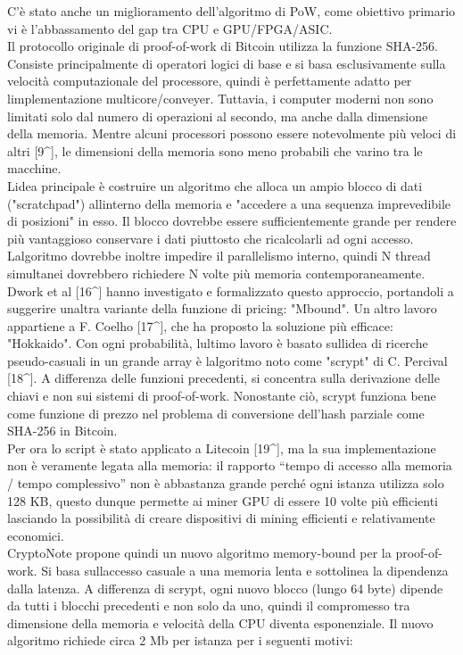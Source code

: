 C'è stato anche un miglioramento dell'algoritmo di PoW, come obiettivo
primario vi è l'abbassamento del gap tra CPU e GPU/FPGA/ASIC.\\
Il protocollo originale di proof-of-work di Bitcoin utilizza la funzione
SHA-256.\\
Consiste principalmente di operatori logici di base e si basa
esclusivamente sulla velocità computazionale del processore, quindi è
perfettamente adatto per l\textquotesingle implementazione
multicore/conveyer. Tuttavia, i computer moderni non sono limitati solo
dal numero di operazioni al secondo, ma anche dalla dimensione della
memoria. Mentre alcuni processori possono essere notevolmente più veloci
di altri {[}9\^{}{]}, le dimensioni della memoria sono meno probabili
che varino tra le macchine.\\
L\textquotesingle idea principale è costruire un algoritmo che alloca un
ampio blocco di dati ("scratchpad") all\textquotesingle interno della
memoria e "accedere a una sequenza imprevedibile di posizioni" in esso.
Il blocco dovrebbe essere sufficientemente grande per rendere più
vantaggioso conservare i dati piuttosto che ricalcolarli ad ogni
accesso. L\textquotesingle algoritmo dovrebbe inoltre impedire il
parallelismo interno, quindi N thread simultanei dovrebbero richiedere N
volte più memoria contemporaneamente.\\
Dwork et al {[}16\^{}{]} hanno investigato e formalizzato questo
approccio, portandoli a suggerire un\textquotesingle altra variante
della funzione di pricing: "Mbound". Un altro lavoro appartiene a F.
Coelho {[}17\^{}{]}, che ha proposto la soluzione più efficace:
"Hokkaido". Con ogni probabilità, l\textquotesingle ultimo lavoro è
basato sull\textquotesingle idea di ricerche pseudo-casuali in un grande
array è l\textquotesingle algoritmo noto come "scrypt" di C. Percival
{[}18\^{}{]}. A differenza delle funzioni precedenti, si concentra sulla
derivazione delle chiavi e non sui sistemi di proof-of-work. Nonostante
ciò, scrypt funziona bene come funzione di prezzo nel problema di
conversione dell'hash parziale come SHA-256 in Bitcoin.\\
Per ora lo script è stato applicato a Litecoin {[}19\^{}{]}, ma la sua
implementazione non è veramente legata alla memoria: il rapporto ``tempo
di accesso alla memoria / tempo complessivo'' non è abbastanza grande
perché ogni istanza utilizza solo 128 KB, questo dunque permette ai
miner GPU di essere 10 volte più efficienti lasciando la possibilità di
creare dispositivi di mining efficienti e relativamente economici.\\
CryptoNote propone quindi un nuovo algoritmo memory-bound per la
proof-of-work. Si basa sull\textquotesingle accesso casuale a una
memoria lenta e sottolinea la dipendenza dalla latenza. A differenza di
scrypt, ogni nuovo blocco (lungo 64 byte) dipende da tutti i blocchi
precedenti e non solo da uno, quindi il compromesso tra dimensione della
memoria e velocità della CPU diventa esponenziale. Il nuovo algoritmo
richiede circa 2 Mb per istanza per i seguenti motivi:

